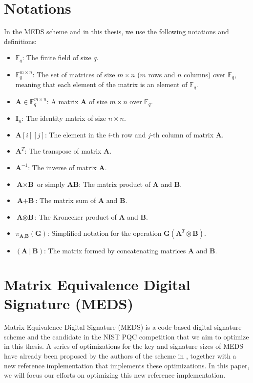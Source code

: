 \documentclass[11pt,a4paper]{report}
\theoremstyle{definition}
\begin{document}
\section{Notations}
\label{sec:notations}
In the MEDS scheme and in this thesis, we use the following notations and definitions:
\begin{itemize}
  \item $\mathbb{F}_q$: The finite field of size $q$.
  \item $\mathbb{F}_q^{m \times n}$: The set of matrices of size $m \times n$ ($m$ rows and $n$ columns) over $\mathbb{F}_q$, meaning that each element of the matrix is an element of $\mathbb{F}_q$.
  \item $\textbf{A} \in \mathbb{F}_q^{m \times n}$: A matrix $\textbf{A}$ of size $m \times n$ over $\mathbb{F}_q$.
  \item $\textbf{I}_n$: The identity matrix of size $n \times n$.
  \item $\textbf{A}[i][j]$: The element in the $i$-th row and $j$-th column of matrix $\textbf{A}$.
  \item $\textbf{A}^T$: The transpose of matrix $\textbf{A}$.
  \item $\textbf{A}^{-1}$: The inverse of matrix $\textbf{A}$.
  \item $\textbf{A} \times \textbf{B}$ or simply $\textbf{AB}$: The matrix product of $\textbf{A}$ and $\textbf{B}$.
  \item $\textbf{A} + \textbf{B}$: The matrix sum of $\textbf{A}$ and $\textbf{B}$.
  \item $\textbf{A} \otimes \textbf{B}$: The Kronecker product of $\textbf{A}$ and $\textbf{B}$.
  \item $\pi_{\textbf{A}, \textbf{B}}(\textbf{G})$: Simplified notation for the operation $\textbf{G}(\textbf{A}^T \otimes \textbf{B})$.
  \item $(\textbf{A}~|~\textbf{B})$: The matrix formed by concatenating matrices $\textbf{A}$ and $\textbf{B}$.
\end{itemize}

\section{Matrix Equivalence Digital Signature (MEDS)}
\label{sec:meds}
Matrix Equivalence Digital Signature (MEDS) \cite{chou2023take} is a code-based digital signature scheme and the candidate in the NIST PQC competition that we aim to optimize in this thesis. A series of optimizations for the key and signature sizes of MEDS have already been proposed by the authors of the scheme in \cite{chou2024reducing}, together with a new reference implementation that implements these optimizations. In this paper, we will focus our efforts on optimizing this new reference implementation.
\end{document}
